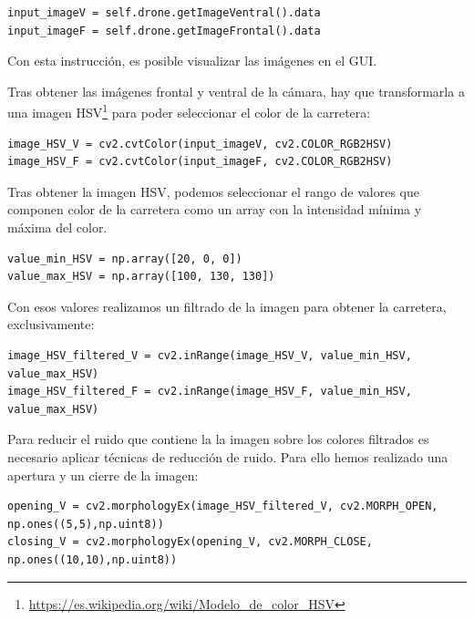 \lstset{language=Python, breaklines=true, basicstyle=\footnotesize}
\begin{lstlisting}[frame=single]
input_imageV = self.drone.getImageVentral().data
input_imageF = self.drone.getImageFrontal().data
\end{lstlisting}

Con esta instrucción, es posible visualizar las imágenes en el GUI.

Tras obtener las imágenes frontal y ventral de la cámara, hay que transformarla a una imagen HSV\footnote{\url{https://es.wikipedia.org/wiki/Modelo_de_color_HSV}} para poder seleccionar el color de la carretera:

\lstset{language=Python, breaklines=true, basicstyle=\footnotesize}
\begin{lstlisting}[frame=single]
image_HSV_V = cv2.cvtColor(input_imageV, cv2.COLOR_RGB2HSV)
image_HSV_F = cv2.cvtColor(input_imageF, cv2.COLOR_RGB2HSV)
\end{lstlisting}

Tras obtener la imagen HSV, podemos seleccionar el rango de valores que componen color de la carretera como un array con la intensidad mínima y máxima del color.

\lstset{language=Python, breaklines=true, basicstyle=\footnotesize}
\begin{lstlisting}[frame=single]
value_min_HSV = np.array([20, 0, 0])
value_max_HSV = np.array([100, 130, 130])
\end{lstlisting}

Con esos valores realizamos un filtrado de la imagen para obtener la carretera, exclusivamente:

\lstset{language=Python, breaklines=true, basicstyle=\footnotesize}
\begin{lstlisting}[frame=single]
image_HSV_filtered_V = cv2.inRange(image_HSV_V, value_min_HSV, value_max_HSV)
image_HSV_filtered_F = cv2.inRange(image_HSV_F, value_min_HSV, value_max_HSV)
\end{lstlisting}

Para reducir el ruido que contiene la la imagen sobre los colores filtrados es necesario aplicar técnicas de reducción de ruido. Para ello hemos realizado una apertura y un cierre de la imagen:

\lstset{language=Python, breaklines=true, basicstyle=\footnotesize}
\begin{lstlisting}[frame=single]
opening_V = cv2.morphologyEx(image_HSV_filtered_V, cv2.MORPH_OPEN, np.ones((5,5),np.uint8))
closing_V = cv2.morphologyEx(opening_V, cv2.MORPH_CLOSE, np.ones((10,10),np.uint8))
\end{lstlisting}


